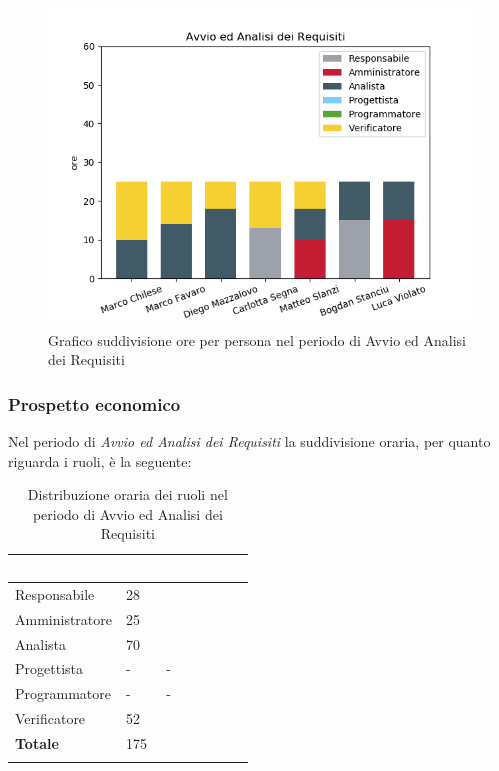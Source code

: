 \begin{figure}[H]
	\centering
  		\includegraphics[width=0.8\linewidth]{./images/fig_aar.png}
  		\caption{Grafico suddivisione ore per persona nel periodo di Avvio ed Analisi dei Requisiti}
  		\label{fig:grafico suddivione ruoli aar}
\end{figure}



\subsubsection{Prospetto economico}
Nel periodo di \textit{Avvio ed Analisi dei Requisiti} la suddivisione oraria, per quanto riguarda i ruoli, è la seguente: 

\begin{longtable}{| C{.30\textwidth}| C{.15\textwidth}| C{.20\textwidth}|}
\hline
{}\textbf{\textcolor{white}{Ruolo}} & \textbf{\textcolor{white}{Ore}} & \textbf{\textcolor{white}{Costo in \euro}} \\
\hline
Responsabile & 28 &  \\
\hline
{}Amministratore & 25 &  \\
\hline
Analista & 70 &  \\
\hline
{}Progettista & - & - \\
\hline
Programmatore & - & - \\
\hline
{}Verificatore & 52 & \\
\hline
\textbf{Totale} & 175 &  \\
\hline

\caption{Distribuzione oraria dei ruoli nel periodo di Avvio ed Analisi dei Requisiti}
\label{tab: distribuzione oraria aar}
\end{longtable}


